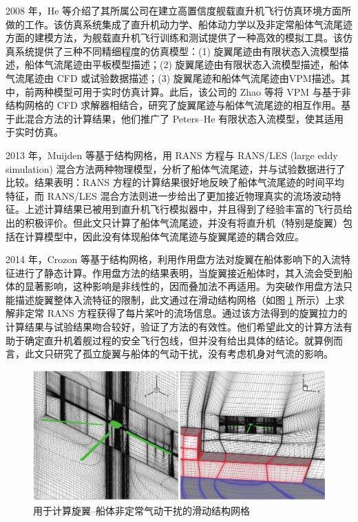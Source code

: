 2008 年，He 等介绍了其所属公司在建立高置信度舰载直升机飞行仿真环境方面所做的工作。该仿真系统集成了直升机动力学、船体动力学以及非定常船体气流尾迹方面的建模方法，为舰载直升机飞行训练和测试提供了一种高效的模拟工具。该仿真系统提供了三种不同精细程度的仿真模型：(1)
旋翼尾迹由有限状态入流模型描述，船体气流尾迹由平板模型描述；(2) 旋翼尾迹由有限状态入流模型描述，船体气流尾迹由 CFD 或试验数据描述；(3)
旋翼尾迹和船体气流尾迹由VPM描述。其中，前两种模型可用于实时仿真计算。此后，该公司的 Zhao 等将
VPM 与基于非结构网格的 CFD 求解器相结合，研究了旋翼尾迹与船体气流尾迹的相互作用。基于此混合方法的计算结果，他们推广了 Peters–He
有限状态入流模型，使其适用于实时仿真。

2013 年，Muijden 等基于结构网格，用 RANS 方程与 RANS/LES
(large eddy simulation) 混合方法两种物理模型，分析了船体气流尾迹，并与试验数据进行了比较。结果表明：RANS
方程的计算结果很好地反映了船体气流尾迹的时间平均特征，而 RANS/LES 混合方法则进一步给出了更加接近物理真实的流场波动特征。上述计算结果已被用到直升机飞行模拟器中，并且得到了经验丰富的飞行员给出的积极评价。但此文只计算了船体气流尾迹，并没有将直升机（特别是旋翼）包括在计算模型中，因此没有体现船体气流尾迹与旋翼尾迹的耦合效应。

2014 年，Crozon 等基于结构网格，利用作用盘方法对旋翼在船体影响下的入流特征进行了静态计算。作用盘方法的结果表明，当旋翼接近船体时，其入流会受到船体的显著影响，这种影响是非线性的，因而叠加法不再适用。为突破作用盘方法只能描述旋翼整体入流特征的限制，此文通过在滑动结构网格（如图
\ref{fig:sliding-mesh} 所示）上求解非定常 RANS 方程获得了每片桨叶的流场信息。通过该方法得到的旋翼拉力的计算结果与试验结果吻合较好，验证了方法的有效性。他们希望此文的计算方法有助于确定直升机着舰过程的安全飞行包线，但并没有给出具体的结论。就算例而言，此文只研究了孤立旋翼与船体的气动干扰，没有考虑机身对气流的影响。
\begin{figure}[h!]
\begin{centering}
\includegraphics[width=1\textwidth,height=0.3\textheight,keepaspectratio]{../review/figures/structured_sliding_mesh}
\par\end{centering}
\caption{\label{fig:sliding-mesh}用于计算旋翼–船体非定常气动干扰的滑动结构网格}
\end{figure}

